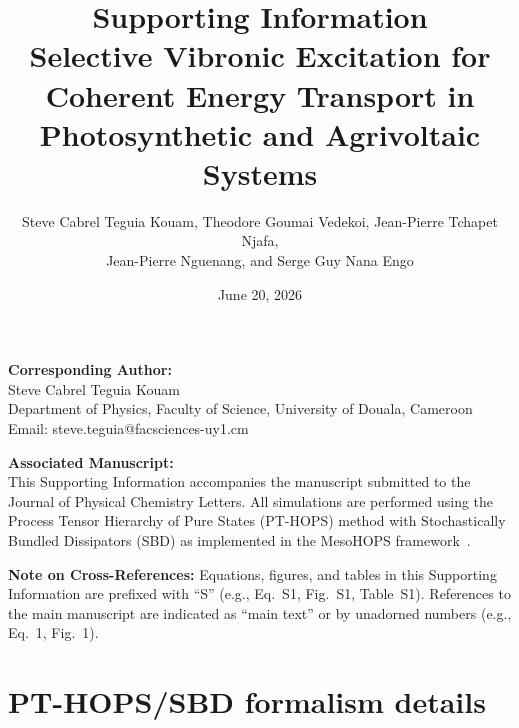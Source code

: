 \documentclass[11pt,a4paper]{article}
\begin{document}
\title{\textbf{Supporting Information}\\[0.5em]
\large Selective Vibronic Excitation for Coherent Energy Transport in Photosynthetic and Agrivoltaic Systems}

\author{Steve Cabrel Teguia Kouam, Theodore Goumai Vedekoi, Jean-Pierre Tchapet Njafa,\\ Jean-Pierre Nguenang, and Serge Guy Nana Engo}

\date{June 20, 2026}

\maketitle

\noindent\textbf{Corresponding Author:}\\
Steve Cabrel Teguia Kouam\\
Department of Physics, Faculty of Science, University of Douala, Cameroon\\
Email: steve.teguia@facsciences-uy1.cm

\vspace{1em}
\noindent\textbf{Associated Manuscript:}\\
This Supporting Information accompanies the manuscript submitted to the Journal of Physical Chemistry Letters. All simulations are performed using the Process Tensor Hierarchy of Pure States (PT-HOPS) method with Stochastically Bundled Dissipators (SBD) as implemented in the MesoHOPS framework~\cite{Varvelo2021,Citty2024}.

\tableofcontents

\newpage

\noindent\textbf{Note on Cross-References:} Equations, figures, and tables in this Supporting Information are prefixed with ``S'' (e.g., Eq.~S1, Fig.~S1, Table~S1). References to the main manuscript are indicated as ``main text'' or by unadorned numbers (e.g., Eq.~1, Fig.~1).

\vspace{1em}


\section{PT-HOPS/SBD formalism details}
\label{sec:formalism}
\end{document}
